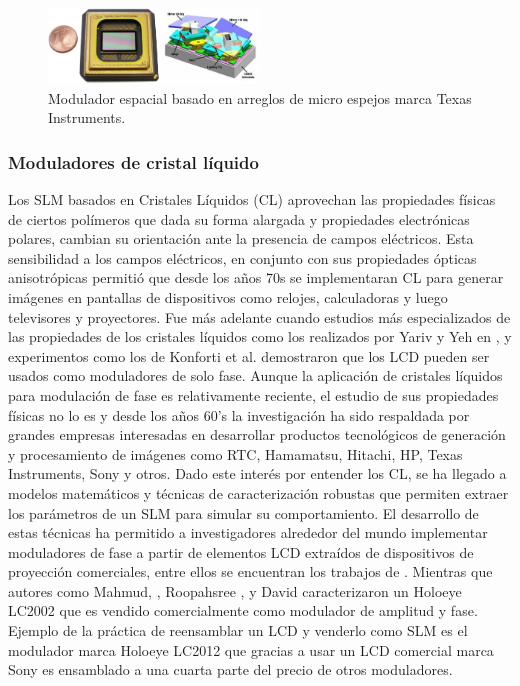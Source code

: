 \begin{figure}[h!]
\centering
    \includegraphics[width=0.5\textwidth]{MEMSLM.png}
\caption[Modulador espacial basado en arreglos de micro espejos]{Modulador espacial basado en arreglos de micro espejos marca Texas Instruments.}
\label{fig:MEMSLM}
\end{figure}

\subsubsection{Moduladores de cristal líquido}
Los SLM basados en Cristales Líquidos (CL) aprovechan las propiedades
físicas de ciertos polímeros que dada su forma alargada y propiedades
electrónicas polares, cambian su orientación ante la presencia de
campos eléctricos.  Esta sensibilidad a los campos eléctricos, en
conjunto con sus propiedades ópticas anisotrópicas permitió que desde
los años 70s se implementaran CL para generar imágenes en pantallas de
dispositivos como relojes, calculadoras y luego televisores y
proyectores. Fue más adelante cuando estudios más especializados de las
propiedades de los cristales líquidos como los realizados por Yariv y Yeh
en , y experimentos como los de Konforti et
al.  demostraron que los LCD pueden ser usados como
moduladores de solo fase. 
Aunque la aplicación de cristales líquidos para modulación de fase es
relativamente reciente, el estudio de sus propiedades físicas no lo es
y desde los años 60’s la investigación ha sido respaldada por grandes
empresas interesadas en desarrollar productos tecnológicos de
generación y procesamiento de imágenes como RTC, Hamamatsu, Hitachi, HP, Texas
Instruments, Sony y otros. Dado este interés por entender los CL, se
ha llegado a modelos matemáticos y  técnicas de  
caracterización robustas que permiten extraer los parámetros de un SLM para
 simular su comportamiento.
El desarrollo de estas técnicas ha permitido a investigadores 
alrededor del mundo implementar moduladores de fase a
partir de elementos LCD extraídos de dispositivos de proyección
comerciales, entre ellos se encuentran los trabajos de
. Mientras
que autores como Mahmud, , Roopahsree
, y David 
caracterizaron un Holoeye LC2002 que es vendido comercialmente como
modulador de amplitud y fase.
Ejemplo de la práctica de reensamblar un LCD y venderlo como SLM es el
modulador marca Holoeye LC2012 que gracias a usar un LCD comercial
marca Sony es ensamblado a una cuarta parte del precio de otros
moduladores. 

